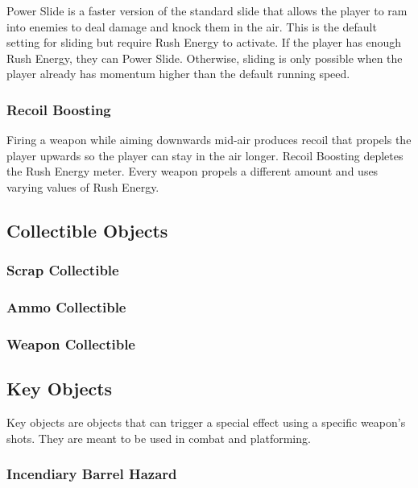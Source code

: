 \documentclass[12pt]{article}
\begin{document}
Power Slide is a faster version of the standard slide that allows the player to ram into enemies to deal damage and knock them in the air. This is the default setting for sliding but require Rush Energy to activate. If the player has enough Rush Energy, they can Power Slide. Otherwise, sliding is only possible when the player already has momentum higher than the default running speed. 

\subsubsection{Recoil Boosting}

Firing a weapon while aiming downwards mid-air produces recoil that propels the player upwards so the player can stay in the air longer. Recoil Boosting depletes the Rush Energy meter. Every weapon propels a different amount and uses varying values of Rush Energy. 

\subsection{Collectible Objects}

\subsubsection{Scrap Collectible}

\subsubsection{Ammo Collectible}

\subsubsection{Weapon Collectible}

\subsection{Key Objects}

Key objects are objects that can trigger a special effect using a specific weapon's shots. They are meant to be used in combat and platforming.

\subsubsection{Incendiary Barrel Hazard}
\end{document}
